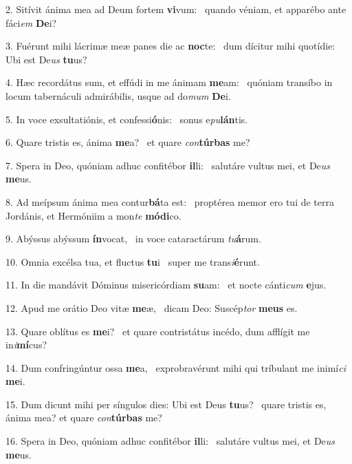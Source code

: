 2. Sitívit ánima mea ad Deum fortem \textbf{vi}vum: \ast\  quando véniam, et apparébo ante fáci\textit{em} \textbf{De}i?\

3. Fuérunt mihi lácrimæ meæ panes die ac \textbf{noc}te: \ast\  dum dícitur mihi quotídie: Ubi est De\textit{us} \textbf{tu}us?\

4. Hæc recordátus sum, et effúdi in me ánimam \textbf{me}am: \ast\  quóniam transíbo in locum tabernáculi admirábilis, usque ad do\textit{mum} \textbf{De}i.\

5. In voce exsultatiónis, et confessi\textbf{ó}nis: \ast\  sonus e\textit{pu}\textbf{lán}tis.\

6. Quare tristis es, ánima \textbf{me}a? \ast\  et quare \textit{con}\textbf{túr}\textbf{bas} me?\

7. Spera in Deo, quóniam adhuc confitébor \textbf{il}li: \ast\  salutáre vultus mei, et De\textit{us} \textbf{me}us.\

8. Ad meípsum ánima mea contur\textbf{bá}ta est: \ast\  proptérea memor ero tui de terra Jordánis, et Hermóniim a mon\textit{te} \textbf{mó}\textbf{di}co.\

9. Abýssus abýssum \textbf{ín}vocat, \ast\  in voce cataractárum \textit{tu}\textbf{á}rum.\

10. Omnia excélsa tua, et fluctus \textbf{tu}i \ast\  super me trans\textit{i}\textbf{é}runt.\

11. In die mandávit Dóminus misericórdiam \textbf{su}am: \ast\  et nocte cánti\textit{cum} \textbf{e}jus.\

12. Apud me orátio Deo vitæ \textbf{me}æ, \ast\  dicam Deo: Suscép\textit{tor} \textbf{me}\textbf{us} es.\

13. Quare oblítus es \textbf{me}i? \ast\  et quare contristátus incédo, dum afflígit me in\textit{i}\textbf{mí}cus?\

14. Dum confringúntur ossa \textbf{me}a, \ast\  exprobravérunt mihi qui tríbulant me inimí\textit{ci} \textbf{me}i.\

15. Dum dicunt mihi per síngulos dies: Ubi est Deus \textbf{tu}us? \ast\  quare tristis es, ánima mea? et quare \textit{con}\textbf{túr}\textbf{bas} me?\

16. Spera in Deo, quóniam adhuc confitébor \textbf{il}li: \ast\  salutáre vultus mei, et De\textit{us} \textbf{me}us.\

